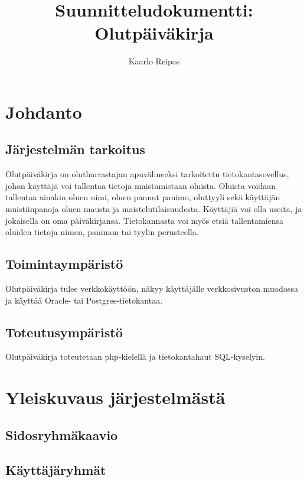 \documentclass[12pt]{amsart}
\title{Suunnitteludokumentti: Olutpäiväkirja}
\author{Kaarlo Reipas}
\begin{document}
\maketitle

\sloppy

\section{Johdanto}
\label{sec:johdanto}

\subsection{Järjestelmän tarkoitus}

Olutpäiväkirja on olutharrastajan apuvälineeksi tarkoitettu tietokantasovellus, johon käyttäjä voi tallentaa tietoja maistamistaan oluista. Oluista voidaan tallentaa ainakin oluen nimi, oluen pannut panimo, oluttyyli sekä käyttäjän muistiinpanoja oluen mausta ja maistelutilaisuudesta. Käyttäjiä voi olla useita, ja jokaisella on oma päiväkirjansa. Tietokannasta voi myös etsiä tallentamiensa oluiden tietoja nimen, panimon tai tyylin perusteella.

\subsection{Toimintaympäristö}

Olutpäiväkirja tulee verkkokäyttöön, näkyy käyttäjälle verkkosivuston muodossa ja käyttää Oracle- tai Postgres-tietokantaa.

\subsection{Toteutusympäristö}

Olutpäiväkirja toteutetaan php-kielellä ja tietokantahaut SQL-kyselyin.

\section{Yleiskuvaus järjestelmästä}

\subsection{Sidosryhmäkaavio}

\subsection{Käyttäjäryhmät}
\end{document}
